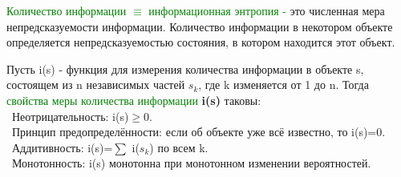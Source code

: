 \newpage
\rhead{\textbf{\textcolor{blue}{И}\textcolor{gray}{змерение количества информации}}}
\vspace*{2mm}
\newline
\textcolor{Green}{Количество информации $\equiv$ информационная энтропия - }
это численная мера непредсказуемости информации. Количество информации в некотором объекте определяется непредсказуемостью состояния, в котором находится этот объект.

\vspace*{1mm}
Пусть i(s) - функция для измерения количества информации в объекте s, состоящем из n независимых частей $s_k$, где k изменяется от 1 до n. Тогда
\textcolor{Green}{свойства меры количества информации} \textbf{i(s)} таковы:\\
\textbullet \ Неотрицательность: i(s)$\geqslant$0. \\
\textbullet \ Принцип предопределённости: если об объекте уже всё известно, то i(s)=0.\\
\textbullet \ Аддитивность: i(s)=$\sum$ i($s_k$) по всем k.\\
\textbullet \ Монотонность: i(s) монотонна при монотонном изменении вероятностей.